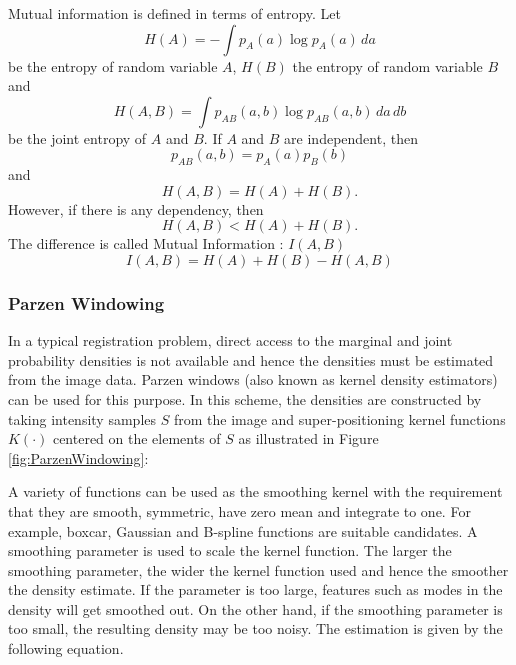 Mutual information is defined in terms of entropy. Let
\begin{equation}
H(A) = - \int p_A(a) \log p_A(a)\, da
\end{equation}
be the entropy of random variable $A$, $H(B)$ the entropy of
random variable $B$ and
\begin{equation}
H(A,B) = \int p_{AB}(a,b) \log p_{AB}(a,b)\,da\,db
\end{equation}
be the joint entropy of $A$ and $B$. If $A$ and $B$ are independent, then
\begin{equation}
p_{AB}(a,b) = p_A(a) p_B(b)
\end{equation}
and
\begin{equation}
H(A,B) = H(A) + H(B).
\end{equation}
However, if there is any dependency, then
\begin{equation}
H(A,B)<H(A)+H(B).
\end{equation}
The difference is called Mutual Information : \( I(A,B) \)
\begin{equation}
I(A,B)=H(A)+H(B)-H(A,B)
\end{equation}

\subsubsection{Parzen Windowing}

In a typical registration problem, direct access to the marginal
and joint probability densities is not available and hence the
densities must be estimated from the image data. Parzen windows
(also known as kernel density estimators) can be used for this purpose.
In this scheme, the densities are constructed by taking intensity
samples $S$ from the image and super-positioning kernel functions
$K(\cdot)$ centered on the elements of $S$ as illustrated in
Figure \ref{fig:ParzenWindowing}:

A variety of functions can be used as the smoothing kernel with the
requirement that they are smooth, symmetric, have zero mean and
integrate to one. For example, boxcar, Gaussian and B-spline functions are
suitable candidates.  A smoothing parameter is used to scale the kernel
function.  The larger the smoothing parameter, the wider the kernel function
used and hence the smoother the density estimate. If the parameter is too
large, features such as modes in the density will get smoothed out.  On the
other hand, if the smoothing parameter is too small, the resulting density
may be too noisy. The estimation is given by the following equation.

